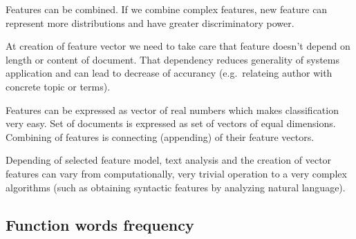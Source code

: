 \documentclass[11pt,english]{article}
\begin{document}
\begin{multicols}{2}
Features can be combined. If we combine complex features, new feature can
represent more distributions and have greater discriminatory power.

At creation of feature vector we need to take care that feature doesn't depend
on length or content of document. That dependency reduces generality of
systems application and can lead to decrease of accurancy (e.g.\ relateing
author with concrete topic or terms).

Features can be expressed as vector of real numbers which makes classification
very easy. Set of documents is expressed as set of vectors of equal dimensions.
Combining of features is connecting (appending) of their feature vectors.


Depending of selected feature model, text analysis and the creation of vector
features can vary from computationally, very trivial operation to a very complex
algorithms (such as obtaining syntactic features by analyzing natural language).


\subsection{Function words frequency}
\label{sec:funkcijske-rijeci}


\end{multicols}
\end{document}
